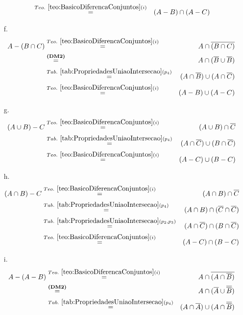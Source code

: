 \begin{prova}
\begin{itemize}
\begin{eqnarray*}
			& \stackrel{Teo. \  \ref{teo:BasicoDiferencaConjuntos}(i)}{=}& (A - B) \cap (A - C)\\
		\end{eqnarray*}
		\item[f.]
		\begin{eqnarray*}
			A - (B \cap C) & \stackrel{Teo. \  \ref{teo:BasicoDiferencaConjuntos}(i)}{=}&  A \cap \overline{(B \cap C)}\\
			& \stackrel{\textbf{(DM2)}}{=}& A \cap (\overline{B} \cup \overline{B})\\
			& \stackrel{Tab. \ \ref{tab:PropriedadesUniaoIntersecao}(p_4)}{=}&  (A \cap \overline{B}) \cup (A \cap \overline{C})\\
			& \stackrel{Teo. \  \ref{teo:BasicoDiferencaConjuntos}(i)}{=}&  (A - B) \cup (A - C)
		\end{eqnarray*}
		\item[g.]
		\begin{eqnarray*}
			(A \cup B) - C & \stackrel{Teo. \  \ref{teo:BasicoDiferencaConjuntos}(i)}{=}& (A \cup B) \cap \overline{C}\\
			& \stackrel{Tab. \ \ref{tab:PropriedadesUniaoIntersecao}(p_4)}{=}& (A \cap \overline{C}) \cup (B \cap \overline{C})\\
			& \stackrel{Teo. \  \ref{teo:BasicoDiferencaConjuntos}(i)}{=} & (A - C) \cup (B - C)
		\end{eqnarray*}
		\item[h.]
		\begin{eqnarray*}
			(A \cap B) - C & \stackrel{Teo. \  \ref{teo:BasicoDiferencaConjuntos}(i)}{=}& (A \cap B) \cap \overline{C}\\
			& \stackrel{Tab. \ \ref{tab:PropriedadesUniaoIntersecao}(p_4)}{=}& (A \cap B) \cap (\overline{C} \cap \overline{C})\\
			& \stackrel{Tab. \ \ref{tab:PropriedadesUniaoIntersecao}(p_2, p_3)}{=}& (A \cap \overline{C}) \cap (B \cap \overline{C})\\
			& \stackrel{Teo. \  \ref{teo:BasicoDiferencaConjuntos}(i)}{=}& (A - C) \cap (B - C)
		\end{eqnarray*}
		\item[i.]
		\begin{eqnarray*}
			A - (A - B) & \stackrel{Teo. \  \ref{teo:BasicoDiferencaConjuntos}(i)}{=} & A \cap \overline{(A \cap \overline{B})}\\
			& \stackrel{\textbf{(DM2)}}{=}& A \cap (\overline{A} \cup \overline{\overline{B}})\\
			& \stackrel{Tab. \ \ref{tab:PropriedadesUniaoIntersecao}(p_4)}{=}& (A \cap \overline{A}) \cup (A \cap \overline{\overline{B}})\\

\end{eqnarray*}
\end{itemize}
\end{prova}
